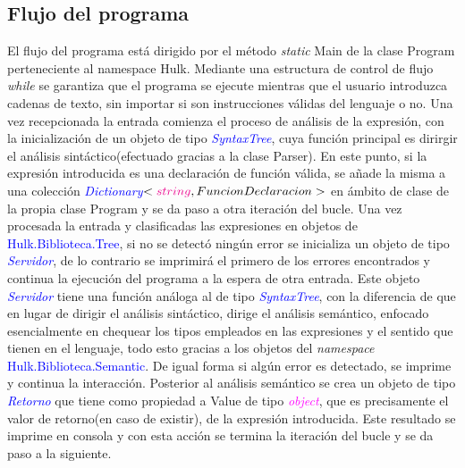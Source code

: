 \documentclass[a4paper, 12pt]{article}
\begin{document}
\subsection{Flujo del programa}\label{}
El flujo del programa está dirigido por el método \textit{static} Main de la clase Program perteneciente al namespace Hulk. Mediante una estructura de control de flujo \textit{while} se garantiza que el programa se ejecute mientras que el usuario introduzca cadenas de texto, sin importar si son instrucciones válidas del lenguaje o no. Una vez recepcionada la entrada comienza el proceso de análisis de la expresión, con la inicialización de un objeto de tipo \textit{\textcolor{blue}{SyntaxTree}}, cuya función principal es dirirgir el análisis sintáctico(efectuado gracias a la clase Parser). En este punto, si la expresión introducida es una declaración de función válida, se añade la misma a una colección \textit{\textcolor{blue}{Dictionary$<\textcolor{magenta}{string}, FuncionDeclaracion>$} } en ámbito de  clase de la propia clase Program y se da paso a otra iteración del bucle. Una vez procesada la entrada y clasificadas las expresiones en objetos de \textcolor{blue}{Hulk.Biblioteca.Tree}, si no se detectó ningún error se inicializa un objeto de tipo  \textit{\textcolor{blue}{Servidor}}, de lo contrario se imprimirá el primero de los errores encontrados y continua la ejecución del programa a la espera de otra entrada. Este objeto \textit{\textcolor{blue}{Servidor}} tiene una función análoga al de tipo  \textit{\textcolor{blue}{SyntaxTree}}, con la diferencia de que en lugar de dirigir el análisis sintáctico, dirige el análisis semántico, enfocado esencialmente en chequear los tipos empleados en las expresiones y el sentido que tienen en el lenguaje, todo esto gracias a los objetos del \textit{namespace} \textcolor{blue}{Hulk.Biblioteca.Semantic}. De igual forma si algún error es detectado, se imprime y continua la interacción. Posterior al análisis semántico se crea un objeto de tipo  \textit{\textcolor{blue}{Retorno}} que tiene como propiedad a Value de tipo  \textit{\textcolor{magenta}{object}}, que es precisamente el valor de retorno(en caso de existir), de la expresión introducida. Este resultado se imprime en consola y con esta acción se termina la iteración del bucle y se da paso a la siguiente.
\end{document}
